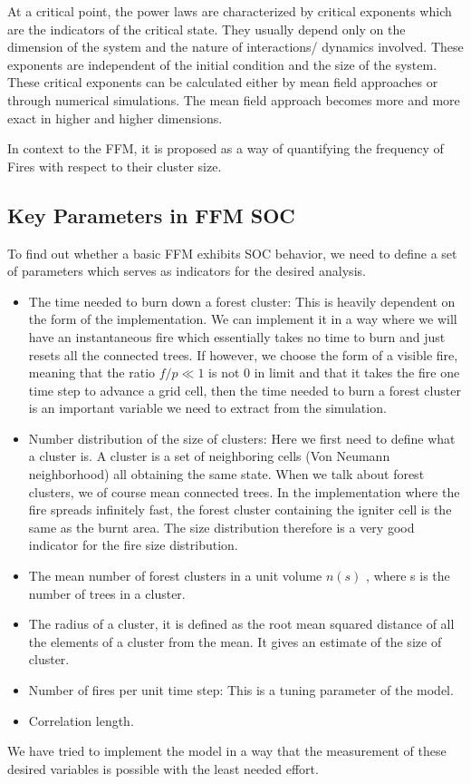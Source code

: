 \documentclass[11pt]{article}
\begin{document}
At a critical point, the power laws are characterized by critical exponents which are the indicators of the critical state. They usually depend only on the dimension of the system and the nature of interactions/ dynamics involved. These exponents are independent of the initial condition and the size of the system. These critical exponents can be calculated either by mean field approaches or through numerical simulations. The mean field approach becomes more and more exact in higher and higher dimensions.

In context to the FFM, it is proposed as a way of quantifying the frequency of Fires with respect to their cluster size. 

\subsection{Key Parameters in FFM SOC}

To find out whether a basic FFM exhibits SOC behavior, we need to define a set of parameters which serves as indicators for the desired analysis. 
\begin{itemize}

\item The time needed to burn down a forest cluster: This is heavily dependent on the form of the implementation. We can implement it in a way where we will have an instantaneous fire which essentially takes no time to burn and just resets all the connected trees. If however, we choose the form of a visible fire, meaning that the ratio $f/p\ll1$  is not 0  in limit and that it takes the fire one time step to advance a grid cell, then the time needed to burn a forest cluster is an important variable we need to extract from the simulation.


\item Number distribution of the size of clusters: Here we first need to define what a cluster is. A cluster is a set of neighboring cells (Von Neumann neighborhood) all obtaining the same state. When we talk about forest clusters, we of course mean connected trees. In the implementation where the fire spreads infinitely fast, the forest cluster containing the igniter cell is the same as the burnt area. The size distribution therefore is a very good indicator for the fire size distribution. 

\item The mean number of forest clusters in a unit volume $n(s)$ , where s  is the number of trees in a cluster. 

\item The radius of a cluster, it is defined as the root mean squared distance of all the elements of a cluster from the mean. It gives an estimate of the size of cluster. 

\item Number of fires per unit time step: This is a tuning parameter of the model.

\item Correlation length.
\end{itemize}
We have tried to implement the model in a way that the measurement of these desired variables is possible with the least needed effort.
\end{document}
